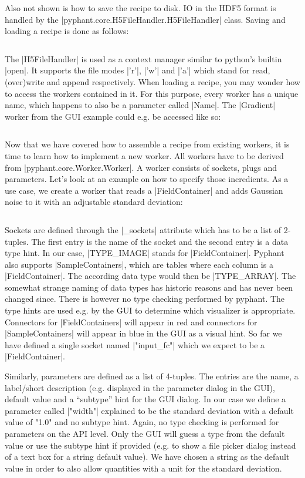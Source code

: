 \documentclass[a4paper]{article}
\begin{document}
Also not shown is how to save the recipe to disk. IO in the HDF5
format is handled by the |pyphant.core.H5FileHandler.H5FileHandler|
class. Saving and loading a recipe is done as follows:

\inputminted[linenos]{python}{api002.py}

The |H5FileHandler| is used as a context manager similar to python's
builtin |open|. It supports the file modes |'r'|, |'w'| and |'a'|
which stand for read, (over)write and append respectively. When
loading a recipe, you may wonder how to access the workers contained
in it. For this purpose, every worker has a unique name, which happens
to also be a parameter called |Name|. The |Gradient| worker from the
GUI example could e.g. be accessed like so:

\inputminted[linenos]{python}{api003.py}

Now that we have covered how to assemble a recipe from existing
workers, it is time to learn how to implement a new worker. All
workers have to be derived from |pyphant.core.Worker.Worker|. A worker
consists of sockets, plugs and parameters. Let's look at an example on
how to specify those incredients. As a use case, we create a worker
that reads a |FieldContainer| and adds Gaussian noise to it with an
adjustable standard deviation:

\inputminted[linenos]{python}{api004.py}

Sockets are defined through the |_sockets| attribute which has to be a
list of 2-tuples. The first entry is the name of the socket and the
second entry is a data type hint. In our case, |TYPE_IMAGE| stands for
|FieldContainer|. Pyphant also supports |SampleContainers|, which are
tables where each column is a |FieldContainer|. The according data
type would then be |TYPE_ARRAY|. The somewhat strange naming of data
types has historic reasons and has never been changed since. There is
however no type checking performed by pyphant. The type hints are used
e.g. by the GUI to determine which visualizer is
appropriate. Connectors for |FieldContainers| will appear in red and
connectors for |SampleContainers| will appear in blue in the GUI as a
visual hint. So far we have defined a single socket named |"input_fc"|
which we expect to be a |FieldContainer|.

Similarly, parameters are defined as a list of 4-tuples. The entries
are the name, a label/short description (e.g. displayed in the parameter
dialog in the GUI), default value and a ``subtype'' hint for the GUI
dialog. In our case we define a parameter called |"width"| explained
to be the standard deviation with a default value of "1.0" and no
subtype hint. Again, no type checking is performed for parameters on
the API level. Only the GUI will guess a type from the default value
or use the subtype hint if provided (e.g. to show a file picker dialog
instead of a text box for a string default value). We have chosen a
string as the default value in order to also allow quantities with a
unit for the standard deviation.
\end{document}
